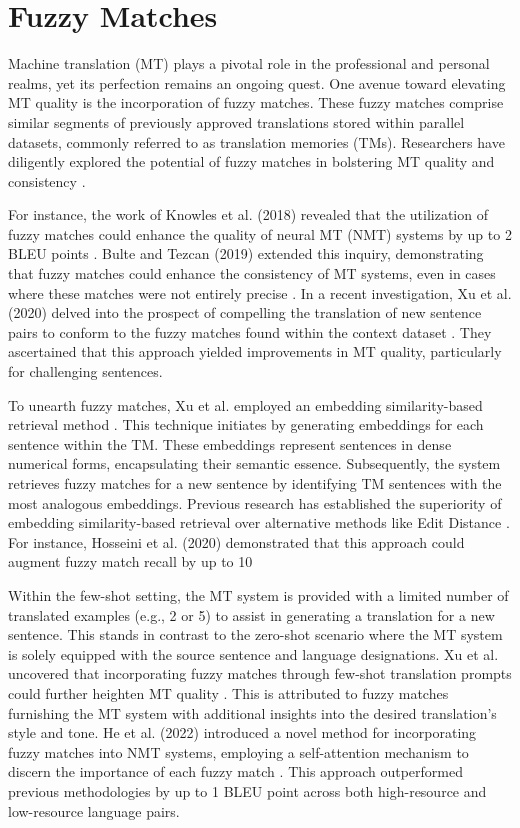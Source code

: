\documentclass[twocolumn]{article}
\begin{document}
\section{Fuzzy Matches}

Machine translation (MT) plays a pivotal role in the professional and personal realms, yet its perfection remains an ongoing quest. One avenue toward elevating MT quality is the incorporation of fuzzy matches. These fuzzy matches comprise similar segments of previously approved translations stored within parallel datasets, commonly referred to as translation memories (TMs). Researchers have diligently explored the potential of fuzzy matches in bolstering MT quality and consistency \cite{knowles2018fuzzy,bulte2019fuzzy,xu2020forcing}.

For instance, the work of Knowles et al. (2018) revealed that the utilization of fuzzy matches could enhance the quality of neural MT (NMT) systems by up to 2 BLEU points \cite{knowles2018fuzzy}. Bulte and Tezcan (2019) extended this inquiry, demonstrating that fuzzy matches could enhance the consistency of MT systems, even in cases where these matches were not entirely precise \cite{bulte2019fuzzy}. In a recent investigation, Xu et al. (2020) delved into the prospect of compelling the translation of new sentence pairs to conform to the fuzzy matches found within the context dataset \cite{xu2020forcing}. They ascertained that this approach yielded improvements in MT quality, particularly for challenging sentences.

To unearth fuzzy matches, Xu et al. employed an embedding similarity-based retrieval method \cite{xu2020forcing}. This technique initiates by generating embeddings for each sentence within the TM. These embeddings represent sentences in dense numerical forms, encapsulating their semantic essence. Subsequently, the system retrieves fuzzy matches for a new sentence by identifying TM sentences with the most analogous embeddings. Previous research has established the superiority of embedding similarity-based retrieval over alternative methods like Edit Distance \cite{hosseini2020embedding}. For instance, Hosseini et al. (2020) demonstrated that this approach could augment fuzzy match recall by up to 10%

Within the few-shot setting, the MT system is provided with a limited number of translated examples (e.g., 2 or 5) to assist in generating a translation for a new sentence. This stands in contrast to the zero-shot scenario where the MT system is solely equipped with the source sentence and language designations. Xu et al. uncovered that incorporating fuzzy matches through few-shot translation prompts could further heighten MT quality \cite{xu2020forcing}. This is attributed to fuzzy matches furnishing the MT system with additional insights into the desired translation's style and tone. He et al. (2022) introduced a novel method for incorporating fuzzy matches into NMT systems, employing a self-attention mechanism to discern the importance of each fuzzy match \cite{he2022incorporating}. This approach outperformed previous methodologies by up to 1 BLEU point across both high-resource and low-resource language pairs.
\end{document}
